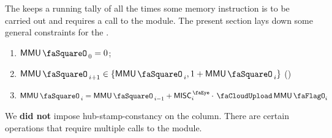 The \mmuStamp{} keeps a running tally of all the times some memory instruction is to be carried out and requires a call to the \mmuMod{} module. The present section lays down some general constraints for the \mmuStamp{}.
\begin{enumerate}
	\item $\mmuStamp_{0} = 0$;
	\item $\mmuStamp_{i + 1} \in \{ \mmuStamp_{i}, 1 + \mmuStamp_{i} \}$ (\trash)
	\item $\mmuStamp_{i} = \mmuStamp_{i - 1} + \peekMisc_{i} \cdot \miscMmuFlag_{i}$
\end{enumerate}
\saNote{}
We \textbf{did not} impose hub-stamp-constancy on the \mmuStamp{} column.
There are certain operations that require multiple calls to the \mmuMod{} module.
